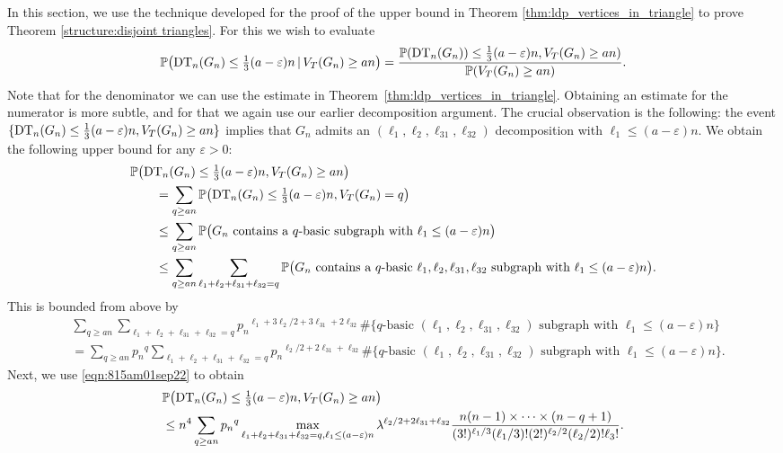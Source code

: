 \documentclass[bj,authoryear,noshowframe]{imsart}
\numberwithin{equation}{section}
\theoremstyle{plain}
\theoremstyle{definition}
\newcommand{\eqan}[1]{\begin{align}#1\end{align}}
\newcommand{\nn}{\nonumber}
\newcommand{\DT}{{\rm DT}}
\begin{document}
In this section, we use the technique developed for the proof of the upper bound in Theorem \ref{thm:ldp_vertices_in_triangle} to prove Theorem \ref{structure:disjoint triangles}. For this we wish to evaluate
	\begin{equation}
	\label{eqn:thumar301144am}
	\mathbb{P}\big(\DT_n(G_n)\leq \tfrac13(a-\varepsilon)n \,|\, V_T(G_n)\geq an\big) 
	= \frac{\mathbb{P}(\DT_n(G_n))\leq \tfrac13(a-\varepsilon)n, V_T(G_n)\geq an) }{\mathbb{P}(V_T(G_n) \geq an)}.
	\end{equation}
Note that for the denominator we can use the estimate in Theorem~\ref{thm:ldp_vertices_in_triangle}. Obtaining an estimate for the numerator is more subtle, and for that we again use our earlier decomposition argument. The crucial observation is the following: the event $\{\DT_n(G_n)\leq \frac13(a-\varepsilon)n, V_T(G_n)\geq an\}$ implies that $G_n$ admits an $(\ell_1,\ell_2,\ell_{31},\ell_{32})$ decomposition with $\ell_1 \leq (a-\varepsilon)n$. We obtain the following upper bound for any $\varepsilon>0$:
	\eqan{
	&\mathbb{P}\big(\DT_n(G_n)\leq {\tfrac13}(a-\varepsilon)n,V_{T}(G_n)  \geq an\big)\\
	&\qquad = \sum_{q\geq an} \mathbb{P}\big(\DT_n(G_n)\leq \tfrac13(a-\varepsilon)n,V_{T}(G_n) ={q}\big)\nn\\
	&\qquad \leq  \sum_{q\geq an} \mathbb{P}\big(G_n \text{ contains a }q \text{-basic subgraph with }
	\ell_1 \leq (a-\varepsilon)n\big)\nn\\
	&\qquad \leq \sum_{q\geq an} \sum_{\ell_1+\ell_2+\ell_{31}+\ell_{32}=q}
	\mathbb{P}\big(G_n \text{ contains a } q \text{-basic }\ell_1, \ell_2, \ell_{31}, \ell_{32} 
	\text{ subgraph with }\ell_1 \leq (a-\varepsilon)n\big).\nn
	}
This is bounded from above by
	\begin{equation}
	\begin{aligned}
	&\sum_{q\geq an} \sum_{\ell_1+\ell_2+\ell_{31}+\ell_{32}=q} {p_n}^{\ell_1 +3\ell_2/2 +3\ell_{31}+2\ell_{32}} 
	\# \{q\text{-basic }(\ell_1, \ell_2, \ell_{31}, \ell_{32}) \text{ subgraph with }\ell_1 \leq (a-\varepsilon)n\} \\
	&= \sum_{q\geq an} {p_n}^{q}\sum_{\ell_1+\ell_2+\ell_{31}+\ell_{32}=q} {p_n}^{\ell_2/2 +2\ell_{31}+\ell_{32}} 
	\# \{q\text{-basic } (\ell_1, \ell_2, \ell_{31}, \ell_{32}) \text{ subgraph with } \ell_1 \leq (a-\varepsilon)n\}.
	\end{aligned}
\end{equation}
Next, we use \eqref{eqn:815am01sep22} to obtain
	\begin{equation}
	\label{eqn:thumar301135am}
	\begin{aligned}
	&\mathbb{P}\big(\DT_n(G_n)\leq \tfrac13(a-\varepsilon)n,V_{T}(G_n) \geq an\big) \\ 
	&\leq n^4 \sum_{q\geq an} {p_n}^{q}\max_{\ell_1+\ell_2+\ell_{31}+\ell_{32}=q, \ell_1 
	\leq (a-\varepsilon)n} {\lambda}^{\ell_2/2 + 2\ell_{31} + \ell_{32}}
	\frac{n(n-1) \times\cdots\times (n-q +1)}{(3!)^{\ell_1/3} (\ell_1/3)!(2!)^{{\ell_2/2}}(\ell_2/2)! \ell_3!}.
	\end{aligned}
	\end{equation}
\end{document}

